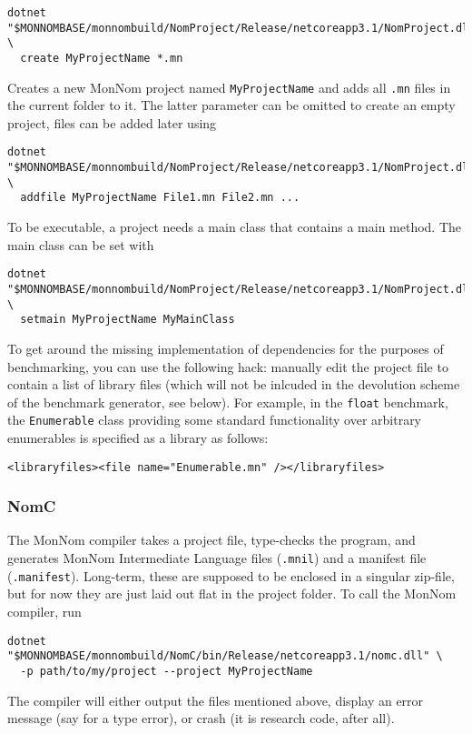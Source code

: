 \documentclass{article}
\begin{document}
\begin{verbatim}
dotnet "$MONNOMBASE/monnombuild/NomProject/Release/netcoreapp3.1/NomProject.dll" \
  create MyProjectName *.mn
\end{verbatim}

Creates a new MonNom project named \texttt{MyProjectName} and adds all \texttt{.mn} files in the current folder to it.
The latter parameter can be omitted to create an empty project, files can be added later using

\begin{verbatim}
dotnet "$MONNOMBASE/monnombuild/NomProject/Release/netcoreapp3.1/NomProject.dll" \
  addfile MyProjectName File1.mn File2.mn ...
\end{verbatim}

To be executable, a project needs a main class that contains a main method.
The main class can be set with

\begin{verbatim}
dotnet "$MONNOMBASE/monnombuild/NomProject/Release/netcoreapp3.1/NomProject.dll" \
  setmain MyProjectName MyMainClass
\end{verbatim}

To get around the missing implementation of dependencies for the purposes of benchmarking, you can use the following hack: manually edit the project file to contain a list of library files (which will not be inlcuded in the devolution scheme of the benchmark generator, see below).
For example, in the \texttt{float} benchmark, the \texttt{Enumerable} class providing some standard functionality over arbitrary enumerables is specified as a library as follows:
\begin{verbatim}
<libraryfiles><file name="Enumerable.mn" /></libraryfiles>
\end{verbatim}

\subsubsection{NomC}
The MonNom compiler takes a project file, type-checks the program, and generates MonNom Intermediate Language files (\texttt{.mnil}) and a manifest file (\texttt{.manifest}).
Long-term, these are supposed to be enclosed in a singular zip-file, but for now they are just laid out flat in the project folder.
To call the MonNom compiler, run
\begin{verbatim}
dotnet "$MONNOMBASE/monnombuild/NomC/bin/Release/netcoreapp3.1/nomc.dll" \
  -p path/to/my/project --project MyProjectName
\end{verbatim}
The compiler will either output the files mentioned above, display an error message (say for a type error), or crash (it is research code, after all).
\end{document}
